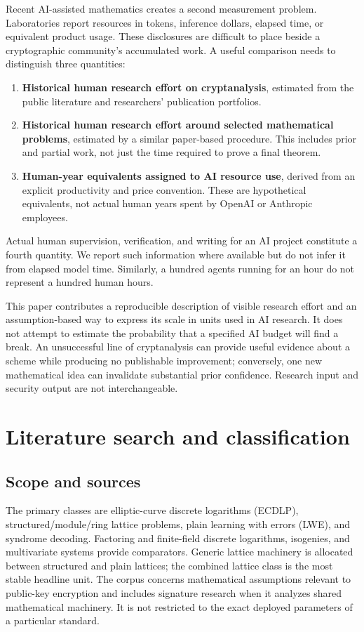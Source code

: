 \documentclass[11pt,letterpaper]{article}
\begin{document}
Recent AI-assisted mathematics creates a second measurement problem. Laboratories report resources in tokens, inference dollars, elapsed time, or equivalent product usage. These disclosures are difficult to place beside a cryptographic community's accumulated work. A useful comparison needs to distinguish three quantities:
\begin{enumerate}
\item \textbf{Historical human research effort on cryptanalysis}, estimated from the public literature and researchers' publication portfolios.
\item \textbf{Historical human research effort around selected mathematical problems}, estimated by a similar paper-based procedure. This includes prior and partial work, not just the time required to prove a final theorem.
\item \textbf{Human-year equivalents assigned to AI resource use}, derived from an explicit productivity and price convention. These are hypothetical equivalents, not actual human years spent by OpenAI or Anthropic employees.
\end{enumerate}
Actual human supervision, verification, and writing for an AI project constitute a fourth quantity. We report such information where available but do not infer it from elapsed model time. Similarly, a hundred agents running for an hour do not represent a hundred human hours.

This paper contributes a reproducible description of visible research effort and an assumption-based way to express its scale in units used in AI research. It does not attempt to estimate the probability that a specified AI budget will find a break. An unsuccessful line of cryptanalysis can provide useful evidence about a scheme while producing no publishable improvement; conversely, one new mathematical idea can invalidate substantial prior confidence. Research input and security output are not interchangeable.

\section{Literature search and classification}
\subsection{Scope and sources}
The primary classes are elliptic-curve discrete logarithms (ECDLP), structured/module/ring lattice problems, plain learning with errors (LWE), and syndrome decoding. Factoring and finite-field discrete logarithms, isogenies, and multivariate systems provide comparators. Generic lattice machinery is allocated between structured and plain lattices; the combined lattice class is the most stable headline unit. The corpus concerns mathematical assumptions relevant to public-key encryption and includes signature research when it analyzes shared mathematical machinery. It is not restricted to the exact deployed parameters of a particular standard.
\end{document}
